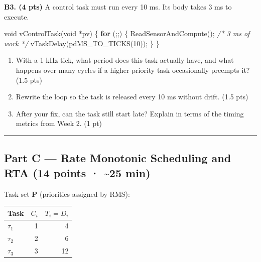 \documentclass[
  11pt,
]{article}
\newenvironment{Shaded}{}{}
\newcommand{\CommentTok}[1]{\textcolor[rgb]{0.38,0.63,0.69}{\textit{#1}}}
\newcommand{\ControlFlowTok}[1]{\textcolor[rgb]{0.00,0.44,0.13}{\textbf{#1}}}
\newcommand{\DataTypeTok}[1]{\textcolor[rgb]{0.56,0.13,0.00}{#1}}
\newcommand{\DecValTok}[1]{\textcolor[rgb]{0.25,0.63,0.44}{#1}}
\newcommand{\NormalTok}[1]{#1}
\newcommand{\OperatorTok}[1]{\textcolor[rgb]{0.40,0.40,0.40}{#1}}
\newcounter{none} %
\providecommand{\tightlist}{%
  \setlength{\itemsep}{0pt}\setlength{\parskip}{0pt}}
\begin{document}
\textbf{B3. (4 pts)} A control task must run every 10 ms. Its body takes
3 ms to execute.

\begin{Shaded}
\begin{Highlighting}[]
\DataTypeTok{void}\NormalTok{ vControlTask}\OperatorTok{(}\DataTypeTok{void} \OperatorTok{*}\NormalTok{pv}\OperatorTok{)}
\OperatorTok{\{}
    \ControlFlowTok{for} \OperatorTok{(;;)} \OperatorTok{\{}
\NormalTok{        ReadSensorAndCompute}\OperatorTok{();}            \CommentTok{/* 3 ms of work */}
\NormalTok{        vTaskDelay}\OperatorTok{(}\NormalTok{pdMS\_TO\_TICKS}\OperatorTok{(}\DecValTok{10}\OperatorTok{));}
    \OperatorTok{\}}
\OperatorTok{\}}
\end{Highlighting}
\end{Shaded}

\begin{enumerate}
\def\labelenumi{\alph{enumi}.}
\tightlist
\item
  With a 1 kHz tick, what period does this task actually have, and what
  happens over many cycles if a higher-priority task occasionally
  preempts it? (1.5 pts)
\item
  Rewrite the loop so the task is released every 10 ms without drift.
  (1.5 pts)
\item
  After your fix, can the task still start late? Explain in terms of the
  timing metrics from Week 2. (1 pt)
\end{enumerate}

\begin{center}\rule{0.5\linewidth}{0.5pt}\end{center}

\subsection{Part C --- Rate Monotonic Scheduling and RTA (14 points ·
\textasciitilde25
min)}\label{part-c-rate-monotonic-scheduling-and-rta-14-points-25-min}

Task set \textbf{P} (priorities assigned by RMS):

{\def\LTcaptype{none} %
\begin{longtable}[]{@{}lrr@{}}
\toprule\noalign{}
Task & \(C_i\) & \(T_i = D_i\) \\
\midrule\noalign{}
\endhead
\bottomrule\noalign{}
\endlastfoot
\(\tau_1\) & 1 & 4 \\
\(\tau_2\) & 2 & 6 \\
\(\tau_3\) & 3 & 12 \\
\end{longtable}
}
\end{document}
